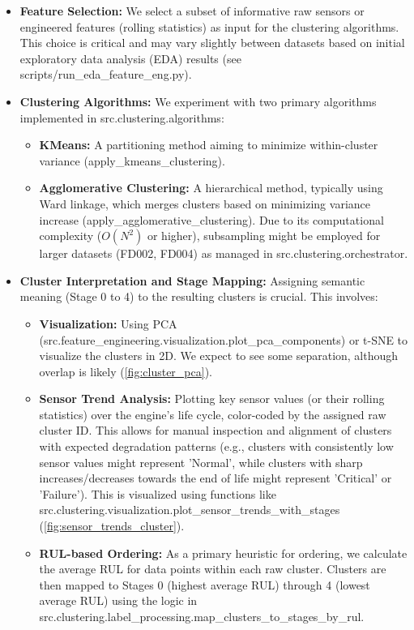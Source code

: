 \begin{itemize}
	\item \textbf{Feature Selection:} We select a subset of informative raw sensors or engineered features (rolling statistics) as input for the clustering algorithms. This choice is critical and may vary slightly between datasets based on initial exploratory data analysis (EDA) results (see scripts/run\_eda\_feature\_eng.py).
	\item \textbf{Clustering Algorithms:} We experiment with two primary algorithms implemented in src.clustering.algorithms:
	      \begin{itemize}
		      \item \textbf{KMeans:} A partitioning method aiming to minimize within-cluster variance (apply\_kmeans\_clustering).
		      \item \textbf{Agglomerative Clustering:} A hierarchical method, typically using Ward linkage, which merges clusters based on minimizing variance increase (apply\_agglomerative\_clustering). Due to its computational complexity ($O(N^2)$ or higher), subsampling might be employed for larger datasets (FD002, FD004) as managed in src.clustering.orchestrator.
	      \end{itemize}
	\item \textbf{Cluster Interpretation and Stage Mapping:} Assigning semantic meaning (Stage 0 to 4) to the resulting clusters is crucial. This involves:
	      \begin{itemize}
		      \item \textbf{Visualization:} Using PCA (src.feature\_engineering.visualization.plot\_pca\_components) or t-SNE to visualize the clusters in 2D. We expect to see some separation, although overlap is likely (\cref{fig:cluster_pca}).
		      \item \textbf{Sensor Trend Analysis:} Plotting key sensor values (or their rolling statistics) over the engine's life cycle, color-coded by the assigned raw cluster ID. This allows for manual inspection and alignment of clusters with expected degradation patterns (e.g., clusters with consistently low sensor values might represent 'Normal', while clusters with sharp increases/decreases towards the end of life might represent 'Critical' or 'Failure'). This is visualized using functions like src.clustering.visualization.plot\_sensor\_trends\_with\_stages (\cref{fig:sensor_trends_cluster}).
		      \item \textbf{RUL-based Ordering:} As a primary heuristic for ordering, we calculate the average RUL for data points within each raw cluster. Clusters are then mapped to Stages 0 (highest average RUL) through 4 (lowest average RUL) using the logic in src.clustering.label\_processing.map\_clusters\_to\_stages\_by\_rul.

\end{itemize}
\end{itemize}
